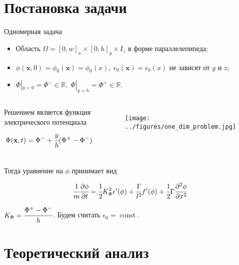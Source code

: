 \documentclass[aspectratio=169]{beamer}
\DeclareMathOperator{\Const}{const}
\newcommand*{\hm}[1]{#1\nobreak\discretionary{}
{\hbox{$\mathsurround=0pt #1$}}{}}
\begin{document}
\section{Постановка задачи}

\begin{frame}{Одномерная задача}
\vspace{-0.2cm}
\begin{itemize}
	\item Область $\Omega = [0, w]_x \times [0, h]_y \times I_z$ в форме параллелепипеда;
	\item $\phi(\textbf{x}, 0) = \phi_0(\textbf{x}) = \phi_0(x), \; \epsilon_0(\textbf{x}) =
	\epsilon_0(x)$ не зависят от $y$ и $z$;
	\item $\Phi|_{y = 0} = \Phi^- \in \mathbb{R}, \; \Phi|_{y = h} = \Phi^+ \in \mathbb{R}$.
\end{itemize}
\vspace{-0.5cm}
\begin{columns}
Решением является функция электрического потенциала
\vspace{-0.2cm}
$$\Phi(\textbf{x}, t) = \Phi^- \hm + \cfrac{y}{h}(\Phi^+ - \Phi^-)$$
\begin{figure}
	\vspace*{-0.8cm}
	\hspace*{0.5cm}
	\texttt{[image: ../figures/one\_dim\_problem.jpg]}
\end{figure}
\end{columns}
\vspace{-0.4cm}
Тогда уравнение на $\phi$ принимает вид
\begin{block}{}
	$$\cfrac{1}{m} \cfrac{\partial \phi}{\partial t} = \cfrac{1}{2} K_\Phi^2 \epsilon'(\phi) +
	\cfrac{\Gamma}{l^2} f'(\phi) + \cfrac{1}{2} \Gamma \cfrac{\partial^2 \phi}{\partial x^2}$$
\end{block}
$K_\Phi = \cfrac{\Phi^+ - \Phi^-}{h}$. Будем считать $\epsilon_0 = \Const$.
\end{frame}


\section{Теоретический анализ}
\end{document}
